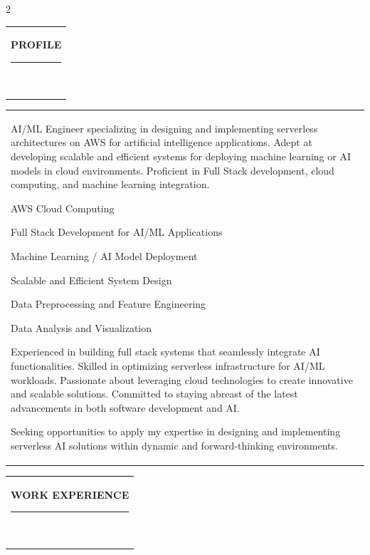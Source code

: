 \documentclass[10pt,A4]{article}
\newcommand{\mpwidth}{\linewidth-\fboxsep-\fboxsep}
\newcommand{\cvlist}[1] {
	\begin{itemize}{#1}\end{itemize}
}
\newcommand{\cvtext}[1] {
	\begin{tabular*}{1\mpwidth}{p{0.98\mpwidth}}
		\parbox{1\mpwidth}{#1}
	\end{tabular*}
}
\newcommand{\cvsection}[1] {
	\vspace{14pt}
	\cvtext{
		\textbf{\LARGE{\textcolor{darkcol}{\uppercase{#1}}}}\\[-4pt]
		\textcolor{maincol}{ \rule{0.1\textwidth}{2pt} } \\
	}
}
\begin{document}
\begin{paracol}{2}
\begin{rightcolumn}
\vfill\null
\cvsection{PROFILE}

\cvtext{
AI/ML Engineer specializing in designing and implementing serverless architectures on AWS for artificial intelligence applications. Adept at developing scalable and efficient systems for deploying machine learning or AI models in cloud environments. Proficient in Full Stack development, cloud computing, and machine learning integration.

\cvlist{
\item AWS Cloud Computing
\item Full Stack Development for AI/ML Applications
\item Machine Learning / AI Model Deployment
\item Scalable and Efficient System Design
\item Data Preprocessing and Feature Engineering
\item Data Analysis and Visualization
}

Experienced in building full stack systems that seamlessly integrate AI functionalities. Skilled in optimizing serverless infrastructure for AI/ML workloads. Passionate about leveraging cloud technologies to create innovative and scalable solutions. Committed to staying abreast of the latest advancements in both software development and AI.

Seeking opportunities to apply my expertise in designing and implementing serverless AI solutions within dynamic and forward-thinking environments.
}



\cvsection{WORK EXPERIENCE}


\end{rightcolumn}
\end{paracol}
\end{document}
